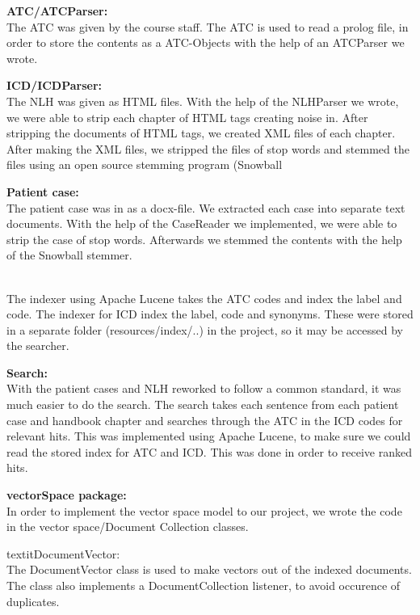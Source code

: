 \begin{description}
\item{\textbf{ATC/ATCParser:}}\\
The ATC was given by the course staff. The ATC is used to read a prolog file, in order to store the contents as a ATC-Objects with the help of an ATCParser we wrote.
\item{\textbf{ICD/ICDParser:}}\\
The NLH was given as HTML files. With the help of the NLHParser we wrote, we were able to strip each chapter of HTML tags creating noise in. After stripping the documents of HTML tags, we created XML files of each chapter. After making the XML files, we stripped the files of stop words and stemmed the files using an open source stemming program (Snowball %
\item{\textbf{Patient case:}}\\
The patient case was in as a docx-file. We extracted each case into separate text documents. With the help of the CaseReader we implemented, we were able to strip the case of stop words. Afterwards we stemmed the contents with the help of the Snowball stemmer.
\item{}\\
The indexer using Apache Lucene %
takes the ATC codes and index the label and code. The indexer for ICD index the label, code and synonyms. These were stored in a separate folder (resources/index/..) in the project, so it may be accessed by the searcher. 
\item{\textbf{Search:}}\\
With the patient cases and NLH reworked to follow a common standard, it was much easier to do the search. The search takes each sentence from each patient case and handbook chapter and searches through the ATC in the ICD codes for relevant hits. This was implemented using Apache Lucene, to make sure we could read the stored index for ATC and ICD. This was done in order to receive ranked hits.
\item{\textbf{vectorSpace package:}}\\
In order to implement the vector space model to our project, we wrote the code in the vector space/Document Collection classes. 
\begin{description}
\item{textit{DocumentVector: }} \\
The DocumentVector class is used to make vectors out of the indexed documents. The class also implements a DocumentCollection listener, to avoid occurence of duplicates.

\end{description}
\end{description}
